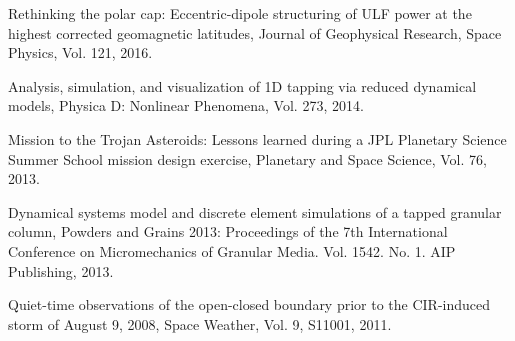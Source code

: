 \documentclass[10pt]{article}
\begin{document}
\begin{itemize*}


  \item
    Rethinking the polar cap: Eccentric-dipole structuring of ULF power
    at the highest corrected geomagnetic latitudes, Journal of Geophysical
    Research, Space Physics, Vol. 121, 2016.

  \item \label{itm:gran1}
    Analysis, simulation, and visualization of 1D tapping via
    reduced dynamical models, Physica D: Nonlinear Phenomena, Vol.
    273, 2014.

  \item
    Mission to the Trojan Asteroids: Lessons learned
    during a JPL Planetary Science Summer School mission design exercise,
    Planetary and Space Science, Vol. 76, 2013.

  \item 
    Dynamical systems model and discrete element simulations of a tapped granular
    column,
    Powders and Grains 2013: Proceedings of
    the 7th International Conference on Micromechanics of Granular
    Media. Vol. 1542. No. 1. AIP Publishing, 2013.

  \item
    Quiet-time observations of the open-closed boundary
    prior to the CIR-induced storm of August 9, 2008,
    Space Weather, Vol. 9, S11001, 2011.


\end{itemize*}
\end{document}
